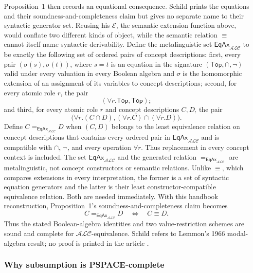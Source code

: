 Proposition~1 then records an equational consequence.  Schild prints the
equations and their soundness-and-completeness claim but gives no separate name
to their syntactic generator set.  Reusing his \(\mathcal E\), the semantic
extension function above, would conflate two different kinds of object, while
the semantic relation \(\equiv\) cannot itself name syntactic derivability.
Define the metalinguistic set \(\mathsf{EqAx}_{\mathcal{ALC}}\) to be exactly
the following set of ordered pairs of concept descriptions: first, every pair
\((\sigma(s),\sigma(t))\), where \(s=t\) is an equation in the signature
\((\mathsf{Top},\cap,\neg)\) valid under every valuation in every Boolean
algebra and \(\sigma\) is the homomorphic extension of an assignment of its
variables to concept descriptions; second, for every atomic role \(r\), the
pair
\[
 (\forall r.\mathsf{Top},\mathsf{Top});
\]
and third, for every atomic role \(r\) and concept descriptions \(C,D\), the
pair
\[
 \bigl(\forall r.(C\cap D),
       (\forall r.C)\cap(\forall r.D)\bigr).
\]
Define \(C=_{\mathsf{EqAx}_{\mathcal{ALC}}}D\) when \((C,D)\) belongs to the
least equivalence relation on concept descriptions that contains every ordered
pair in \(\mathsf{EqAx}_{\mathcal{ALC}}\) and is compatible with \(\cap\),
\(\neg\), and every operation \(\forall r\).  Thus replacement in every
concept context is included.  The set
\(\mathsf{EqAx}_{\mathcal{ALC}}\) and the generated relation
\(=_{\mathsf{EqAx}_{\mathcal{ALC}}}\) are metalinguistic, not concept
constructors or semantic relations.  Unlike \(\equiv\), which compares
extensions in every interpretation, the former is a set of syntactic equation
generators and the latter is their least constructor-compatible equivalence
relation.  Both
are needed immediately.  With this handbook reconstruction,
Proposition~1's soundness-and-completeness claim becomes
\[
 C=_{\mathsf{EqAx}_{\mathcal{ALC}}}D
 \quad\Longleftrightarrow\quad C\equiv D.
\]
Thus the stated Boolean-algebra identities and two value-restriction schemes
are sound and complete for \(\mathcal{ALC}\)-equivalence.  Schild refers to
Lemmon's 1966 modal-algebra result; no proof is printed in the article
\cite[prop.~1, p.~468]{Schild1991}.

\subsubsection{Why subsumption is PSPACE-complete}

